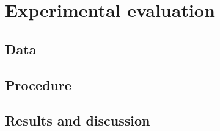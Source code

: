 \documentclass{article}
\begin{document}
\section{Experimental evaluation}

\subsection{Data}

\subsection{Procedure}

\subsection{Results and discussion}



\newpage


\end{document}
